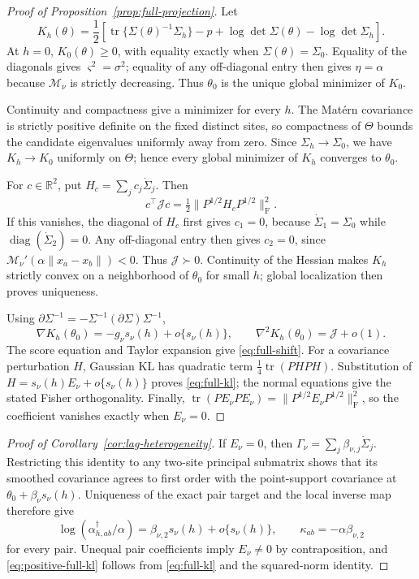 \documentclass[sigconf]{acmart}
\theoremstyle{remark}
\newcommand{\Matern}{\mathcal M}
\newcommand{\R}{\mathbb R}
\newcommand{\tr}{\operatorname{tr}}
\begin{document}
\begin{proof}[Proof of Proposition~\ref{prop:full-projection}]
Let
\[
 K_h(\theta)=\frac12\left[
 \tr\{\Sigma(\theta)^{-1}\Sigma_h\}-p+
 \log\det\Sigma(\theta)-\log\det\Sigma_h\right].
\]
At \(h=0\), \(K_0(\theta)\geq0\), with equality exactly when
\(\Sigma(\theta)=\Sigma_0\). Equality of the diagonals gives
\(\varsigma^2=\sigma^2\); equality of any off-diagonal entry then gives
\(\eta=\alpha\) because \(\Matern_\nu\) is strictly decreasing. Thus
\(\theta_0\) is the unique global minimizer of \(K_0\).

Continuity and compactness give a minimizer for every \(h\). The Matérn
covariance is strictly positive definite on the fixed distinct sites, so
compactness of \(\Theta\) bounds the candidate
eigenvalues uniformly away from zero. Since \(\Sigma_h\to\Sigma_0\), we have
\(K_h\to K_0\) uniformly on \(\Theta\); hence every global minimizer of
\(K_h\) converges to \(\theta_0\).

For \(c\in\R^2\), put \(H_c=\sum_jc_j\dot\Sigma_j\). Then
\[
 c^\top\mathcal Jc
 =\tfrac12\|P^{1/2}H_cP^{1/2}\|_{\mathrm F}^2.
\]
If this vanishes, the diagonal of \(H_c\) first gives \(c_1=0\), because
\(\dot\Sigma_1=\Sigma_0\) while \(\operatorname{diag}(\dot\Sigma_2)=0\).
Any off-diagonal entry then gives \(c_2=0\), since
\(\Matern_\nu'(\alpha\|x_a-x_b\|)<0\). Thus \(\mathcal J\succ0\).
Continuity of the Hessian makes \(K_h\) strictly convex on a neighborhood of
\(\theta_0\) for small \(h\); global localization then proves uniqueness.

Using \(\partial\Sigma^{-1}=-\Sigma^{-1}(\partial\Sigma)\Sigma^{-1}\),
\[
 \nabla K_h(\theta_0)=-g_\nu s_\nu(h)+o\{s_\nu(h)\},\qquad
 \nabla^2K_h(\theta_0)=\mathcal J+o(1).
\]
The score equation and Taylor expansion give \eqref{eq:full-shift}.
For a covariance perturbation \(H\), Gaussian KL has
quadratic term \(\tfrac14\tr(PHPH)\). Substitution of
\(H=s_\nu(h)E_\nu+o\{s_\nu(h)\}\) proves \eqref{eq:full-kl}; the normal
equations give the stated Fisher orthogonality. Finally,
\(\tr(PE_\nu PE_\nu)=\|P^{1/2}E_\nu P^{1/2}\|_{\mathrm F}^2\), so the
coefficient vanishes exactly when \(E_\nu=0\).
\end{proof}

\begin{proof}[Proof of Corollary~\ref{cor:lag-heterogeneity}]
If \(E_\nu=0\), then
\(\Gamma_\nu=\sum_j\beta_{\nu,j}\dot\Sigma_j\). Restricting this identity to
any two-site principal submatrix shows that its smoothed covariance agrees to
first order with the point-support covariance at
\(\theta_0+\beta_\nu s_\nu(h)\). Uniqueness of the exact pair target and the
local inverse map therefore give
\[
 \log(\alpha_{h,ab}^\dagger/\alpha)
 =\beta_{\nu,2}s_\nu(h)+o\{s_\nu(h)\},
 \qquad \kappa_{ab}=-\alpha\beta_{\nu,2}
\]
for every pair. Unequal pair coefficients imply \(E_\nu\ne0\) by
contraposition, and \eqref{eq:positive-full-kl} follows from
\eqref{eq:full-kl} and the squared-norm identity.
\end{proof}
\end{document}
